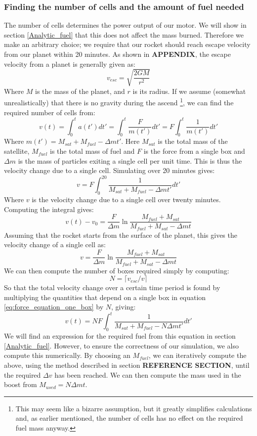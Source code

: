 \documentclass[a4paper,10pt,english]{article}
\begin{document}
\subsubsection{Finding the number of cells and the amount of fuel needed}
The number of cells determines the power output of our motor. We will show in section \ref{Analytic_fuel} that this does not affect the mass burned. Therefore we make an arbitrary choice; we require that our rocket should reach escape velocity from our planet within 20 minutes. As shown in \textbf{APPENDIX}, the escape velocity from a planet is generally given as:
\begin{equation}\label{eq:escape_velocity}
v_{esc}=\sqrt{\frac{2GM}{r^2}}
\end{equation}
Where $M$ is the mass of the planet, and $r$ is its radius. If we assume (somewhat unrealistically) that there is no gravity during the ascend \footnote{This may seem like a bizarre assumption, but it greatly simplifies calculations and, as earlier mentioned, the number of cells has no effect on the required fuel mass anyway.}, we can find the required number of cells from:
$$v(t)=\int_0^t a(t')dt'=\int_0^t \frac{F}{m(t')}dt'=F\int_0^t\frac{1}{m(t')}dt'$$
Where $m(t')=M_{sat}+M_{fuel}-\Delta m t'$. Here $M_{sat}$ is the total mass of the satellite, $M_{fuel}$ is the total mass of fuel and $F$ is the force from a single box and $\Delta m$ is the mass of particles exiting a single cell per unit time. This is thus the velocity change due to a single cell. Simulating over 20 minutes gives:
\begin{equation}\label{eq:force_equation_one_box}
v=F\int_0^{20}\frac{1}{M_{sat}+M_{fuel}-\Delta m t'}dt'
\end{equation}
Where $v$ is the velocity change due to a single cell over twenty minutes. Computing the integral gives:
\begin{equation}\label{eq:analytic_velocity_change}
v(t)-v_0=\frac{F}{\Delta m}\ln \frac{M_{fuel}+M_{sat}}{M_{fuel}+M_{sat}-\Delta m t}
\end{equation}
Assuming that the rocket starts from the surface of the planet, this gives the velocity change of a single cell as:
$$v=\frac{F}{\Delta m}\ln\frac{M_{fuel}+M_{sat}}{M_{fuel}+M_{sat}-\Delta m t}$$
We can then compute the number of boxes required simply by computing:
\begin{equation}\label{eq:number_of_boxes_needed}
N=\lceil v_{esc}/v\rceil
\end{equation}
So that the total velocity change over a certain time period is found by multiplying the quantities that depend on a single box in equation \ref{eq:force_equation_one_box} by $N$, giving:
\begin{equation}\label{eq:force_equation_many_boxes}
v(t)=NF\int_0^{t}\frac{1}{M_{sat}+M_{fuel}-N\Delta m t'}dt'
\end{equation}
We will find an expression for the required fuel from this equation in section \ref{Analytic_fuel}. However, to ensure the correctness of our simulation, we also compute this numerically. By choosing an $M_{fuel}$, we can iteratively compute the above, using the method described in section \textbf{REFERENCE SECTION}, until the required $\Delta v$ has been reached. We can then compute the mass used in the boost from $M_{used}=N\Delta m t$.
\end{document}
